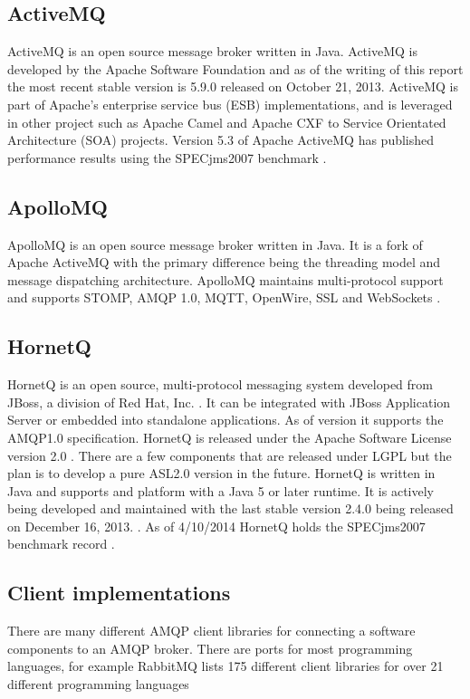 \documentclass{thesis}
\begin{document}

\subsection{ActiveMQ}
ActiveMQ is an open source message broker written in Java.  ActiveMQ is developed by the Apache Software Foundation and as of the writing of this report the most recent stable version is 5.9.0 released on October 21, 2013.  ActiveMQ is part of Apache's enterprise service bus (ESB) implementations, and is leveraged in other project such as Apache Camel and Apache CXF to Service Orientated Architecture (SOA) projects. Version 5.3 of Apache ActiveMQ has published performance results using the SPECjms2007 benchmark \cite{ACTIVEMQ_WIKI}. 

\subsection{ApolloMQ}
ApolloMQ is an open source message broker written in Java.  It is a fork of Apache ActiveMQ with the primary difference being the threading model and message dispatching architecture.  ApolloMQ maintains multi-protocol support and supports STOMP, AMQP 1.0, MQTT, OpenWire, SSL and WebSockets \cite{APOLLO}.

\subsection{HornetQ}
HornetQ is an open source, multi-protocol messaging system developed from JBoss, a division of Red Hat, Inc. \cite{REDHAT}.  It can be integrated with JBoss Application Server or embedded into standalone applications.  As of version  it supports the AMQP1.0 specification.  HornetQ is released under the Apache Software License version 2.0 .  There are a few components that are released under LGPL  but the plan is to develop a pure ASL2.0 version in the future.  HornetQ is written in Java and supports and platform with a Java 5 or later runtime.   It is actively being developed and maintained with the last stable version 2.4.0 being released on December 16, 2013. \cite{HORNETQ}.  As of 4/10/2014 HornetQ holds the SPECjms2007 benchmark record \cite{HORNETQ_WIKI}.

\subsection{Client implementations}
There are many different AMQP client libraries for connecting a software components to an AMQP broker.  There are ports for most programming languages, for example RabbitMQ lists 175 different client libraries for over 21 different programming languages \cite{RABBITMQ_CLIENTS}
\end{document}
